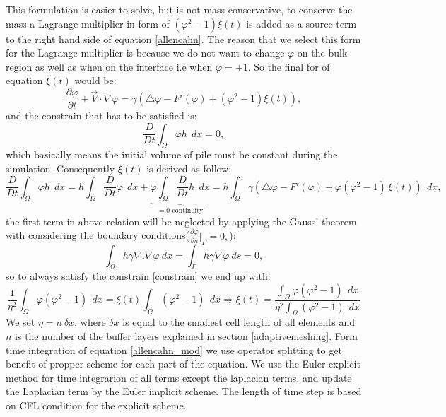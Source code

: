\documentclass[letterpaper,10pt]{article}
\begin{document}
This formulation is easier to solve, but is not mass conservative, to conserve the mass a Lagrange multiplier in form of $(\varphi^2-1)\xi(t)$ is added as a source term to the right hand side of equation \eqref{allencahn}. The reason that we select this form for the Lagrange multiplier is because we do not want to change $\varphi$ on the bulk region as well as when on the interface i.e when $\varphi=\pm1$. So the final for of equation $\xi(t)$ would be:  
\begin{equation} 
        \label{allencahn_mod}
        \frac{\partial \varphi }{\partial t} + \overrightarrow{V}\cdot \nabla \varphi = 
        \gamma (\bigtriangleup\varphi -F'(\varphi)+ (\varphi^2-1)\xi(t)),
\end{equation}
and the constrain that has to be satisfied is:
\begin{equation} 
        \label{constrain}
        \frac{D}{Dt} \int_\Omega \varphi h \ \ dx= 0,
\end{equation}
which basically means the initial volume of pile must be constant during the simulation. Consequently $\xi(t)$ is derived as follow:
\begin{equation} 
        \label{eta}
        \frac{D}{Dt} \int_\Omega \varphi h \ \ dx= h \int_\Omega \frac{D}{Dt}  \varphi  \ \ dx+\underbrace{\varphi \int_\Omega  \frac{D}{Dt} h  \ \ dx}_{=0 \text{\ \ continuity}}=h\int_\Omega \gamma (\bigtriangleup\varphi -F'(\varphi)+\varphi (\varphi^2-1)\ \xi(t)) \ \ dx,
\end{equation}
the first term in above relation will be neglected by applying the Gauss' theorem with considering the boundary conditions($
        \frac{\partial \varphi}{\partial n}\vert_{\Gamma} = 0,
$):
\begin{equation}
        \label{lapbound}
        \int_\Omega h \gamma  \nabla. \nabla \varphi \ dx = 
        \int_\Gamma h \gamma \nabla \varphi \ ds = 0,
\end{equation}
so to always satisfy the constrain \eqref{constrain} we end up with:
\begin{equation} 
        \label{eta_cont}
\frac{1}{\eta^2} \int_\Omega  \varphi (\varphi^2 -1) \ \ dx = \xi(t) \int_\Omega (\varphi^2-1)  \ \ dx \Rightarrow \xi(t) = \frac{\int_\Omega  \varphi (\varphi^2 -1) \ \ dx}{\eta^2 \int_\Omega (\varphi^2-1)  \ \ dx }
\end{equation}
We set $\eta=n\  \delta x$, where $\delta x$ is equal to the smallest cell length of all elements and $n$ is the number of the buffer layers explained in section \ref{adaptivemeshing}.
Form time integration of equation \eqref{allencahn_mod} we use operator splitting to get benefit of propper scheme for each part of the equation. We use the Euler explicit method for time integrarion of all terms except the laplacian terms, and update the Laplacian term by the Euler implicit scheme. The length of time step is based on CFL condition for the explicit scheme. 
\end{document}
